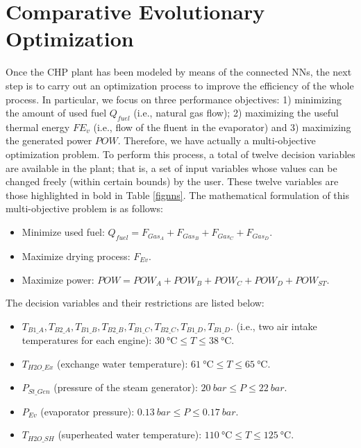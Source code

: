 \section{Comparative Evolutionary Optimization}
\label{sec:optimization}
Once the CHP plant has been modeled by means of the connected NNs, the next step is to  carry out an optimization process to improve the efficiency of the whole process. In particular, we focus on three performance objectives: 1) minimizing the amount of used fuel $Q_{fuel}$ (i.e., natural gas flow); 2) maximizing the useful thermal energy $FE_v$ (i.e., flow of the fluent in the evaporator) and 3) maximizing the generated power $POW$. Therefore, we have actually a multi-objective optimization problem. To perform this process, a total of twelve decision variables  are available in the plant; that is, a set of input variables whose values can be changed freely (within certain bounds) by the user. These twelve variables are those highlighted in bold in Table \ref{fignns}. The mathematical formulation of this multi-objective problem is as follows:
%
\begin{itemize}[-]
	\item Minimize used fuel: $Q_{fuel} = F_{Gas_A} + F_{Gas_B} + F_{Gas_C} + F_{Gas_D}$.
	\item Maximize drying process: $F_{Ev}$.
	\item Maximize power: $POW = POW_A + POW_B + POW_C + POW_D + POW_{ST}$.
\end{itemize}
%
The decision variables and their restrictions are listed below:
%
\begin{itemize}[-]
	\item $T_{B1\_A}, T_{B2\_A}, T_{B1\_B}, T_{B2\_B}, T_{B1\_C}, T_{B2\_C}, T_{B1\_D}, T_{B1\_D}$. (i.e., two air intake temperatures for each engine): $\SI{30}{\celsius} \leq T  \leq  \SI{38}{\celsius}$.
	\item $T_{H2O\_Ex}$ (exchange water temperature): $\SI{61}{\celsius}  \leq T  \leq  \SI{65}{\celsius}$.
	\item $P_{St\_Gen}$ (pressure of the steam generator): $\SI{20}{bar}  \leq  P  \leq  \SI{22}{bar}$.
	\item $P_{Ev}$ (evaporator pressure): $\SI{0.13}{bar}  \leq  P  \leq  \SI{0.17}{bar}$.
	\item $T_{H2O\_SH}$ (superheated water temperature): $\SI{110}{\celsius}  \leq  T  \leq  \SI{125}{\celsius}$.
\end{itemize}

